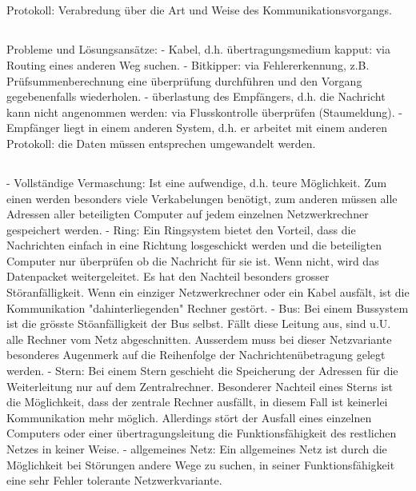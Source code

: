 \subsection{}
\begin{answer}
Protokoll: Verabredung über die Art und Weise des Kommunikationsvorgangs.
\end{answer}

\subsection{}
\begin{answer}
Probleme und Lösungsansätze:
- Kabel, d.h. übertragungsmedium kapput: via Routing eines anderen Weg suchen.
- Bitkipper: via Fehlererkennung, z.B. Prüfsummenberechnung eine überprüfung durchführen und
den Vorgang gegebenenfalls wiederholen.
- überlastung des Empfängers, d.h. die Nachricht kann nicht angenommen werden: via Flusskontrolle
überprüfen (Staumeldung).
- Empfänger liegt in einem anderen System, d.h. er arbeitet mit einem anderen Protokoll: die
Daten müssen entsprechen umgewandelt werden.
\end{answer}

\subsection{}
\begin{answer}
- Vollständige Vermaschung:
Ist eine aufwendige, d.h. teure Möglichkeit. Zum einen werden besonders viele Verkabelungen
benötigt, zum anderen müssen alle Adressen aller beteiligten Computer auf jedem einzelnen Netzwerkrechner
gespeichert werden.
- Ring:
Ein Ringsystem bietet den Vorteil, dass die Nachrichten einfach in eine Richtung losgeschickt
werden und die beteiligten Computer nur überprüfen ob die Nachricht für sie ist. Wenn nicht,
wird das Datenpacket weitergeleitet.
Es hat den Nachteil besonders grosser Störanfälligkeit. Wenn ein einziger Netzwerkrechner oder
ein Kabel ausfält, ist die Kommunikation "dahinterliegenden" Rechner gestört.
- Bus:
Bei einem Bussystem ist die grösste Stöanfälligkeit der Bus selbst. Fällt diese Leitung aus, sind
u.U. alle Rechner vom Netz abgeschnitten. Ausserdem muss bei dieser Netzvariante besonderes
Augenmerk auf die Reihenfolge der Nachrichtenübetragung gelegt werden.
- Stern:
Bei einem Stern geschieht die Speicherung der Adressen für die Weiterleitung nur auf dem Zentralrechner.
Besonderer Nachteil eines Sterns ist die Möglichkeit, dass der zentrale Rechner ausfällt, in
diesem Fall ist keinerlei Kommunikation mehr möglich. Allerdings stört der Ausfall eines einzelnen
Computers oder einer übertragungsleitung die Funktionsfähigkeit des restlichen Netzes in keiner
Weise.
- allgemeines Netz:
Ein allgemeines Netz ist durch die Möglichkeit bei Störungen andere Wege zu suchen, in seiner
Funktionsfähigkeit eine sehr Fehler tolerante Netzwerkvariante.
\end{answer}

